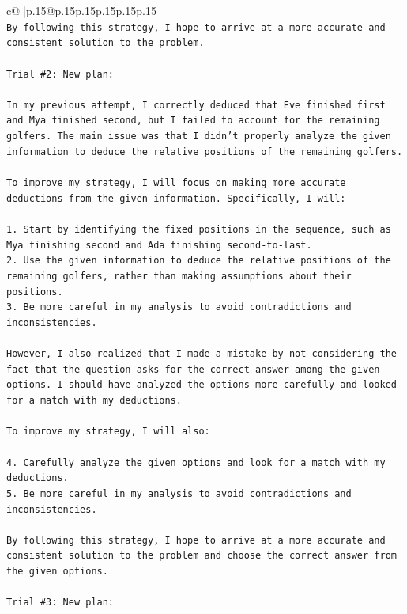 \documentclass{article}
\begin{document}
{\begin{supertabular}{c@{$\;$}|p{.15\linewidth}@{}p{.15\linewidth}p{.15\linewidth}p{.15\linewidth}p{.15\linewidth}p{.15\linewidth}}
{{{\\ 
\texttt{By following this strategy, I hope to arrive at a more accurate and consistent solution to the problem.} \\
\\ 
\texttt{Trial \#2: New plan: } \\
\\ 
\texttt{In my previous attempt, I correctly deduced that Eve finished first and Mya finished second, but I failed to account for the remaining golfers. The main issue was that I didn't properly analyze the given information to deduce the relative positions of the remaining golfers.} \\
\\ 
\texttt{To improve my strategy, I will focus on making more accurate deductions from the given information. Specifically, I will:} \\
\\ 
\texttt{1. Start by identifying the fixed positions in the sequence, such as Mya finishing second and Ada finishing second{-}to{-}last.} \\
\texttt{2. Use the given information to deduce the relative positions of the remaining golfers, rather than making assumptions about their positions.} \\
\texttt{3. Be more careful in my analysis to avoid contradictions and inconsistencies.} \\
\\ 
\texttt{However, I also realized that I made a mistake by not considering the fact that the question asks for the correct answer among the given options. I should have analyzed the options more carefully and looked for a match with my deductions.} \\
\\ 
\texttt{To improve my strategy, I will also:} \\
\\ 
\texttt{4. Carefully analyze the given options and look for a match with my deductions.} \\
\texttt{5. Be more careful in my analysis to avoid contradictions and inconsistencies.} \\
\\ 
\texttt{By following this strategy, I hope to arrive at a more accurate and consistent solution to the problem and choose the correct answer from the given options.} \\
\\ 
\texttt{Trial \#3: New plan: } \\
}}}
\end{supertabular}}
\end{document}
